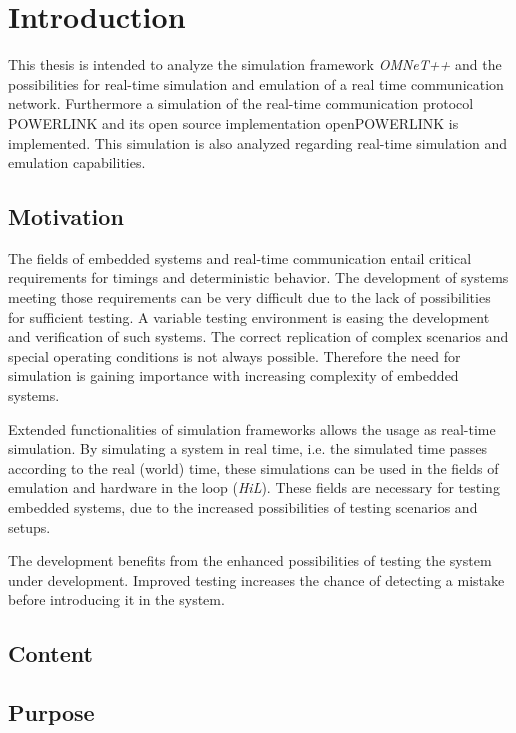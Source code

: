 \chapter{Introduction}
\label{cha:introduction}
This thesis is intended to analyze the simulation framework \emph{OMNeT++} \cite{omnet_manual} and the possibilities for real-time simulation and emulation of a real time communication network.
Furthermore a simulation of the real-time communication protocol POWERLINK and its open source implementation openPOWERLINK \cite{openpowerlink} is implemented. %
This simulation is also analyzed regarding real-time simulation and emulation capabilities.

\section{Motivation}
The fields of embedded systems and real-time communication entail critical requirements for timings and deterministic behavior.
The development of systems meeting those requirements can be very difficult due to the lack of possibilities for sufficient testing.
A variable testing environment is easing the development and verification of such systems.
The correct replication of complex scenarios and special operating conditions is not always possible.
Therefore the need for simulation is gaining importance with increasing complexity of embedded systems.

Extended functionalities of simulation frameworks allows the usage as real-time simulation.
By simulating a system in real time, i.e. the simulated time passes according to the real (world) time, these simulations can be used in the fields of emulation and hardware in the loop (\emph{HiL}).
These fields are necessary for testing embedded systems, due to the increased possibilities of testing scenarios and setups.

The development benefits from the enhanced possibilities of testing the system under development.
Improved testing increases the chance of detecting a mistake before introducing it in the system.



\section{Content}

\section{Purpose}
